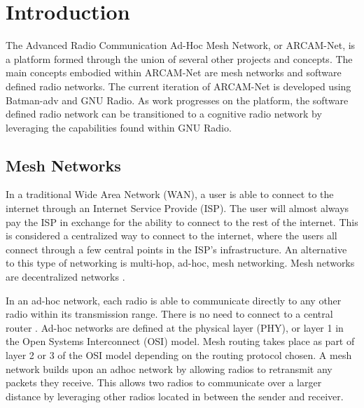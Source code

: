 
\chapter{Introduction} %

\label{Chapter1} %

The Advanced Radio Communication Ad-Hoc Mesh Network, or ARCAM-Net, is a platform formed through the union of several other projects and concepts. The main concepts embodied within ARCAM-Net are mesh networks and software defined radio networks. The current iteration of ARCAM-Net is developed using Batman-adv and GNU Radio. As work progresses on the platform, the software defined radio network can be transitioned to a cognitive radio network by leveraging the capabilities found within GNU Radio. 


\newcommand{\keyword}[1]{\textbf{#1}}
\newcommand{\tabhead}[1]{\textbf{#1}}
\newcommand{\code}[1]{\texttt{#1}}
\newcommand{\file}[1]{\texttt{\bfseries#1}}
\newcommand{\option}[1]{\texttt{\itshape#1}}


\section{Mesh Networks}

In a traditional Wide Area Network (WAN), a user is able to connect to the internet through an Internet Service Provide (ISP). The user will almost always pay the ISP in exchange for the ability to connect to the rest of the internet. This is considered a centralized way to connect to the internet, where the users all connect through a few central points in the ISP's infrastructure. An alternative to this type of networking is multi-hop, ad-hoc, mesh networking. Mesh networks are decentralized networks \cite{4796928}. 

In an ad-hoc network, each radio is able to communicate directly to any other radio within its transmission range. There is no need to connect to a central router \cite{4796928}. Ad-hoc networks are defined at the physical layer (PHY), or layer 1 in the Open Systems Interconnect (OSI) model. Mesh routing takes place as part of layer 2 or 3 of the OSI model depending on the routing protocol chosen. A mesh network builds upon an adhoc network by allowing radios to retransmit any packets they receive. This allows two radios to communicate over a larger distance by leveraging other radios located in between the sender and receiver\cite{0033}. 

